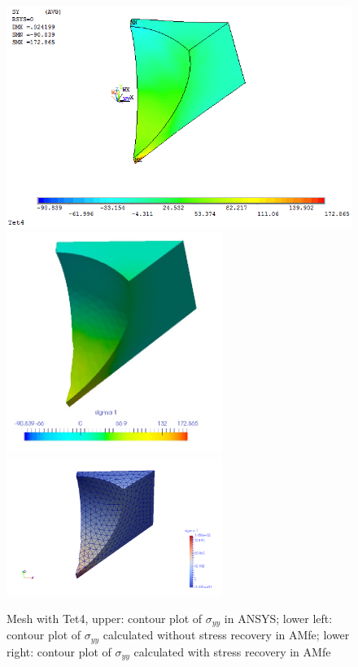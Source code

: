 \begin{figure}[htbp]
	\begin{center}
		\includegraphics[width=13cm,clip]{Tet4Syy.png} 
		\includegraphics[width=7cm,clip]{Tet4SyyPD.png} 			
		\includegraphics[width=7cm,clip]{Tet4SyyP.png} 		
		\caption{Mesh with Tet4, upper: contour plot of $\sigma_{yy}$ in ANSYS; lower left: contour plot of $\sigma_{yy}$ calculated without stress recovery in AMfe; lower right: contour plot of $\sigma_{yy}$ calculated with stress recovery in AMfe} \label{fig: Tet4_Syy}
	\end{center}
\end{figure}
\clearpage 

